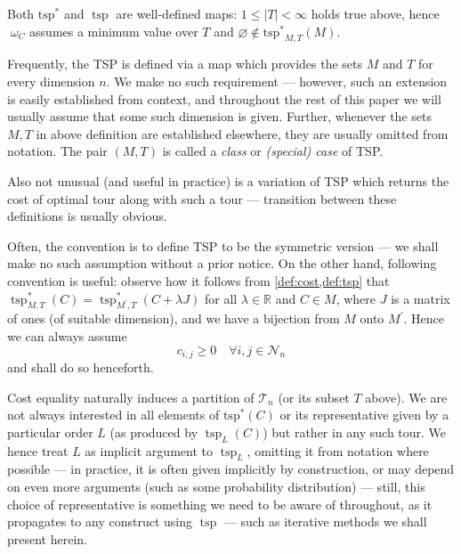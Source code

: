 \documentclass[titlepage,twoside,index=totoc,bibliography=totoc]{scrartcl}
\numberwithin{equation}{section}
\numberwithin{figure}{section}
\numberwithin{table}{section}
\let\defstyle\itshape
\begin{document}
\begin{remark}
  Both $\operatorname{tsp^\ast}$ and $\operatorname{tsp}$ are well-defined maps:
  $1 \leq \left|T\right| < \infty$ holds true above, hence $\;\omega_C$ assumes a minimum
  value over $T$ and $\varnothing \notin \operatorname{tsp^\ast}_{M,T}\left(M\right)$.
\end{remark}

\begin{remark}
Frequently, the TSP is defined via a map which provides the sets $M$ and
$T$ for every dimension $n$.  We make no such requirement --- however, such
an extension is easily established from context, and throughout the rest of
this paper we will usually assume that some such dimension is given.
Further, whenever the sets $M,T$ in above definition are established elsewhere,
they are usually omitted from notation.  The pair $(M,T)$ is called a
{\defstyle class} or {\defstyle (special) case} of TSP.
\end{remark}

\begin{remark}
  Also not unusual (and useful in practice) is a variation of TSP which
  returns the cost of optimal tour along with such a tour --- transition
  between these definitions is usually obvious.
\end{remark}

\begin{remark}
Often, the convention is to define TSP to be the symmetric version
--- we shall make no such assumption without a prior notice.
On the other hand, following convention is useful:
observe how it follows from \cref{def:cost,def:tsp} that
$\operatorname{tsp}_{M,T}^\ast\left(C\right) =
 \operatorname{tsp}_{M^\prime,T}^\ast\left(C + \lambda J\right)$
for all $\lambda \in \mathbb{R}$ and $C \in M$,
where $J$ is a matrix of ones (of suitable dimension),
and we have a bijection from $M$ onto $M^\prime$.
Hence we can always assume
\[
  c_{i,j} \geq 0 \quad \forall i,j \in \mathcal{N}_n
\]
and shall do so henceforth.
\end{remark}

\begin{remark}
\label{rem:order}
  Cost equality naturally induces a partition of $\mathcal{T}_n$ (or its
  subset $T$ above).  We are not always interested in all elements of
  $\operatorname{tsp^\ast}\left(C\right)$ or its representative given by a
  particular order $L$ (as produced by $\operatorname{tsp}_L\left(C\right)$)
  but rather in any such tour.
  We hence treat $L$ as implicit argument
  to $\operatorname{tsp}_L$, omitting it from notation where possible ---
  in practice, it is often given implicitly by construction, or may depend
  on even more arguments (such as some probability distribution) ---
  still, this choice of representative is something we need to be aware of
  throughout, as it propagates to any construct using $\operatorname{tsp}$ ---
  such as iterative methods we shall present herein.
\end{remark}
\end{document}
